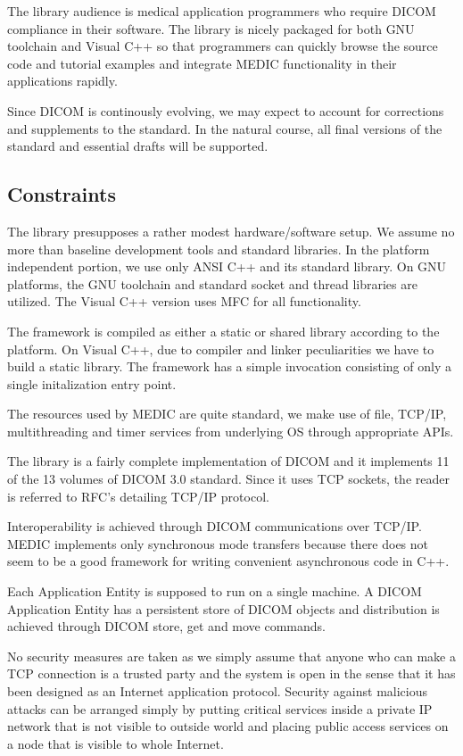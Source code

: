 \documentclass[a4paper,10pt]{article}
\begin{document}
The library audience is medical application programmers who require
DICOM compliance in their software. The library is nicely packaged
for both GNU toolchain and Visual C++ so that programmers can quickly
browse the source code and tutorial examples and integrate
MEDIC functionality in their applications rapidly.

Since DICOM is continously evolving, we may expect to account for
corrections and supplements to the standard. In the natural course,
all final versions of the standard and essential drafts will be supported.

\subsection{Constraints}

The library presupposes a rather modest hardware/software setup. We
assume no more than baseline development tools and standard
libraries. In the platform independent portion, we use only ANSI C++
and its standard library. On GNU platforms, the GNU toolchain and
standard socket and thread libraries are utilized. The Visual C++
version uses MFC for all functionality.

The framework is compiled as either a static or shared library
according to the platform. On Visual C++, due to compiler and linker
peculiarities we have to build a static library. The framework
has a simple invocation consisting of only a single initalization
entry point.

The resources used by MEDIC are quite standard, we make use of
file, TCP/IP, multithreading and timer services from underlying OS
through appropriate APIs.

The library is a fairly complete implementation of DICOM and it
implements 11 of the 13 volumes of DICOM 3.0 standard. Since it
uses TCP sockets, the reader is referred to RFC's
detailing TCP/IP protocol.

Interoperability is achieved through DICOM communications over TCP/IP.
MEDIC implements only synchronous mode transfers because there does not
seem to be a good framework for writing convenient asynchronous code
in C++.

Each Application Entity is supposed to run on a single machine. A
DICOM Application Entity has a persistent store of DICOM objects
and distribution is achieved through DICOM store, get and move
commands.

No security measures are taken as we simply assume that anyone
who can make a TCP connection is a trusted party and the system
is open in the sense that it has been designed as an Internet
application protocol. Security against malicious attacks can
be arranged simply by putting critical services inside a private
IP network that is not visible to outside world and placing
public access services on a node that is visible to whole Internet.
\end{document}
